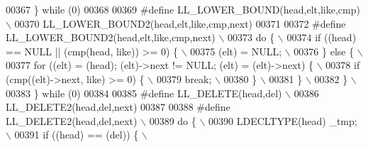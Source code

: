 \begin{DoxyCode}
00367 \textcolor{preprocessor}{\} while (0)}
00368 
00369 \textcolor{preprocessor}{#define LL\_LOWER\_BOUND(head,elt,like,cmp)                                                      \(\backslash\)}
00370 \textcolor{preprocessor}{    LL\_LOWER\_BOUND2(head,elt,like,cmp,next)}
00371 
00372 \textcolor{preprocessor}{#define LL\_LOWER\_BOUND2(head,elt,like,cmp,next)                                                \(\backslash\)}
00373 \textcolor{preprocessor}{  do \{                                                                                         \(\backslash\)}
00374 \textcolor{preprocessor}{    if ((head) == NULL || (cmp(head, like)) >= 0) \{                                            \(\backslash\)}
00375 \textcolor{preprocessor}{      (elt) = NULL;                                                                            \(\backslash\)}
00376 \textcolor{preprocessor}{    \} else \{                                                                                   \(\backslash\)}
00377 \textcolor{preprocessor}{      for ((elt) = (head); (elt)->next != NULL; (elt) = (elt)->next) \{                         \(\backslash\)}
00378 \textcolor{preprocessor}{        if (cmp((elt)->next, like) >= 0) \{                                                     \(\backslash\)}
00379 \textcolor{preprocessor}{          break;                                                                               \(\backslash\)}
00380 \textcolor{preprocessor}{        \}                                                                                      \(\backslash\)}
00381 \textcolor{preprocessor}{      \}                                                                                        \(\backslash\)}
00382 \textcolor{preprocessor}{    \}                                                                                          \(\backslash\)}
00383 \textcolor{preprocessor}{  \} while (0)}
00384 
00385 \textcolor{preprocessor}{#define LL\_DELETE(head,del)                                                                    \(\backslash\)}
00386 \textcolor{preprocessor}{    LL\_DELETE2(head,del,next)}
00387 
00388 \textcolor{preprocessor}{#define LL\_DELETE2(head,del,next)                                                              \(\backslash\)}
00389 \textcolor{preprocessor}{do \{                                                                                           \(\backslash\)}
00390 \textcolor{preprocessor}{  LDECLTYPE(head) \_tmp;                                                                        \(\backslash\)}
00391 \textcolor{preprocessor}{  if ((head) == (del)) \{                                                                       \(\backslash\)}

\end{DoxyCode}
